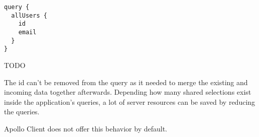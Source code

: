 \ifshowListings
\begin{listing}[H]
\begin{verbatim}
query {
  allUsers {
    id
    email
  }
}
\end{verbatim}
\caption{TODO}\label{code:background:query-reduction:example-query-reduced}
\end{listing}
\fi

The id can't be removed from the query as it needed to merge the existing and incoming data together afterwards. Depending how many shared selections exist inside the application's queries, a lot of server resources can be saved by reducing the queries. 

Apollo Client does not offer this behavior by default. 